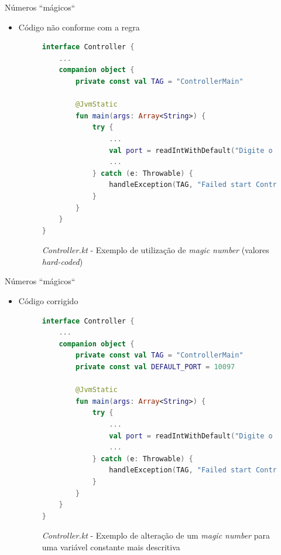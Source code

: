 \documentclass[brazilian]{beamer}
\begin{document}
\begin{frame}[fragile]{Números ``mágicos``}
    \begin{itemize}
        \item Código não conforme com a regra
        \begin{figure}[H]
            \centering
            \begin{lstlisting}[language=Kotlin]
interface Controller {
    ...
    companion object {
        private const val TAG = "ControllerMain"

        @JvmStatic
        fun main(args: Array<String>) {
            try {
                ...
                val port = readIntWithDefault("Digite o valor da porta do servidor", 10097)
                ...
            } catch (e: Throwable) {
                handleException(TAG, "Failed start Controller...", e)
            }
        }
    }
}
            \end{lstlisting}
            \caption{\textit{Controller.kt} - Exemplo de utilização de \textit{magic number} (valores \textit{hard-coded})}
            \label{fig:detekt_magic_number_before_example}
        \end{figure}
    \end{itemize}
\end{frame}

\begin{frame}[fragile]{Números ``mágicos``}
    \begin{itemize}
        \item Código corrigido
        \begin{figure}[H]
            \centering
            \begin{lstlisting}[language=Kotlin]
interface Controller {
    ...
    companion object {
        private const val TAG = "ControllerMain"
        private const val DEFAULT_PORT = 10097

        @JvmStatic
        fun main(args: Array<String>) {
            try {
                ...
                val port = readIntWithDefault("Digite o valor da porta do servidor", DEFAULT_PORT)
                ...
            } catch (e: Throwable) {
                handleException(TAG, "Failed start Controller...", e)
            }
        }
    }
}
            \end{lstlisting}
            \caption{\textit{Controller.kt} - Exemplo de alteração de um \textit{magic number} para uma variável constante mais descritiva}
            \label{fig:detekt_magic_number_after_example}
        \end{figure}
    \end{itemize}
\end{frame}
\end{document}
